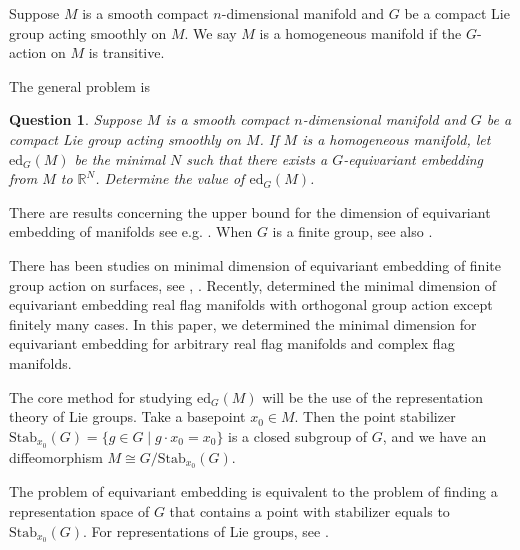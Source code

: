 \documentclass[a4paper]{amsart}
\newcommand{\Stab}{{\mathrm{Stab}}}\newcommand{\Symb}{{\mathrm{Symb}}}\newcommand{\MS}{{\mathrm{MS}}}
\theoremstyle{plain}
\newtheorem{ques}[thm]{Question} \newtheorem{prop}[thm]{Proposition}
\theoremstyle{remark} \newtheorem{remark}[thm]{Remark}
\theoremstyle{remark} \newtheorem{exercise}{Exercise}
\theoremstyle{remark} \newtheorem{example}{Example}
\numberwithin{equation}{section}
\begin{document}
\begin{defn} Suppose $M$ is a smooth compact $n$-dimensional manifold and $G$ be a compact Lie group acting smoothly on $M$. We say $M$ is a homogeneous manifold if the $G$-action on $M$ is transitive.
\end{defn}

The general problem is

\begin{ques}
Suppose $M$ is a smooth compact $n$-dimensional manifold and $G$ be a compact Lie group acting smoothly on $M$. If $M$ is a homogeneous manifold, let $\text{ed}_G(M)$ be the minimal $N$ such that there exists a $G$-equivariant embedding from $M$ to $\mathbb{R}^N$. Determine the value of $\text{ed}_G(M)$.
\end{ques}

There are results concerning the upper bound for the dimension of equivariant embedding of manifolds see e.g. \cite{Was69}. When $G$ is a finite group, see also \cite{Wan22}. 

There has been studies on minimal dimension of  equivariant embedding of finite group action on surfaces, see  \cite{WWZZ}, \cite{WWW}. Recently, \cite{LY} determined the minimal dimension of equivariant embedding real flag manifolds with orthogonal group action except finitely many cases. In this paper, we determined the minimal dimension for equivariant embedding for arbitrary real flag manifolds and complex flag manifolds.







The core method for studying $\text{ed}_G(M)$ will be the use of the representation theory of Lie groups. Take a basepoint $x_0\in M$. Then the point stabilizer $\Stab_{x_0}(G)=\{g\in G\mid g\cdot x_0=x_0\}$ is a closed subgroup of $G$, and we have an diffeomorphism $M\cong G/\Stab_{x_0}(G)$. %

The problem of equivariant embedding is equivalent to the problem of finding a representation space of $G$ that contains a point with stabilizer equals to $\Stab_{x_0}(G)$. For representations of Lie groups, see \cite{FH91}.
\end{document}
